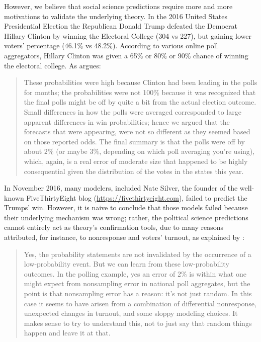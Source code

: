 \documentclass{statsoc}
\begin{document}
However, we believe that social science predictions require more and more motivations to validate the underlying theory. In the 2016 United States Presidential Election the Republican Donald Trump defeated the Democrat Hillary Clinton by winning the Electoral College (304 vs 227), but gaining lower voters' percentage (46.1\% vs 48.2\%). According to various online poll aggregators, Hillary Clinton was given a 65\% or 80\% or 90\% chance of winning the electoral college.  As \cite{gelman2016elections} argues:

\begin{quote}
 These probabilities were high because Clinton had been leading in the polls for months; the probabilities were not 100\% because it was recognized that the final polls might be off by quite a bit from the actual election outcome. Small differences in how the polls were averaged corresponded to large apparent differences in win probabilities; hence we argued that the forecasts that were appearing, were not so different as they seemed based on those reported odds. The final summary is that the polls were off by about 2\% (or maybe 3\%, depending on which poll averaging you’re using), which, again, is a real error of moderate size that happened to be highly consequential given the distribution of the votes in the states this year.
\end{quote}
%
In November 2016, many modelers, included Nate Silver, the founder of the well-known FiveThirtyEight blog (\url{https://fivethirtyeight.com}), failed to predict the Trumps' win. However, it is naive to conclude that those models failed because their underlying mechanism was wrong; rather, the political science predictions cannot  entirely act as theory's confirmation tools, due to many reasons attributed, for instance, to nonresponse and voters' turnout, as explained by \cite{gelman2016elections2}:

\begin{quote}
Yes, the probability statements are not invalidated by the occurrence of a low-probability event. But we can learn from these low-probability outcomes. In the polling example, yes an error of 2\% is within what one might expect from nonsampling error in national poll aggregates, but the point is that nonsampling error has a reason: it’s not just random. In this case it seems to have arisen from a combination of differential nonresponse, unexpected changes in turnout, and some sloppy modeling choices. It makes sense to try to understand this, not to just say that random things happen and leave it at that.
\end{quote}
\end{document}
